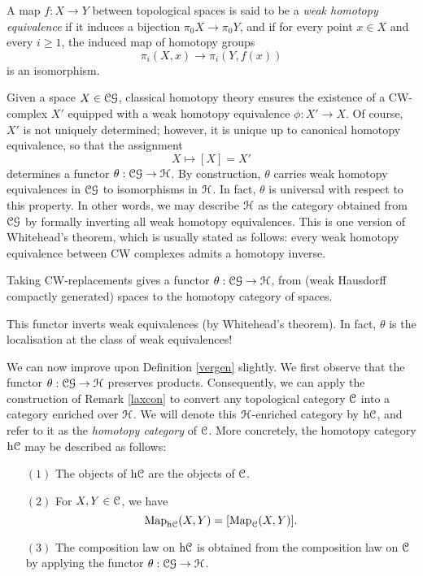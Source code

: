 \begin{1.1.3 Equivalences of Top Cats}
\begin{definition}
A map $f: X \rightarrow Y$ between topological spaces is said to be a {\it weak homotopy equivalence}
if it induces a bijection $\pi_0 X \rightarrow \pi_0 Y$, and if 
for every point $x \in X$ and every $i \geq 1$, the induced map of homotopy groups
$$ \pi_{i}(X,x) \rightarrow \pi_i(Y,f(x))$$ is an isomorphism.
\end{definition}

Given a space $X \in \operatorname{\mathcal{C}\mathcal{G}}$, classical homotopy theory ensures the existence of a CW-complex
$X'$ equipped with a weak homotopy equivalence $\phi: X' \rightarrow X$. Of course,
$X'$ is not uniquely determined; however, it is unique up to canonical homotopy equivalence,
so that the assignment
$$ X \mapsto [X] = X'$$
determines a functor $\theta: \operatorname{\mathcal{C}\mathcal{G}} \rightarrow \operatorname{\mathcal{H}}$. By construction, $\theta$ carries
weak homotopy equivalences in $\operatorname{\mathcal{C}\mathcal{G}}$ to isomorphisms in $\operatorname{\mathcal{H}}$. In fact, $\theta$
is universal with respect to this property. In other words, we may describe $\operatorname{\mathcal{H}}$
as the category obtained from $\operatorname{\mathcal{C}\mathcal{G}}$ by formally inverting all weak homotopy equivalences.
This is one version of Whitehead's theorem, which is usually stated as follows: every weak homotopy equivalence between CW complexes admits a homotopy inverse.
\begin{shaded}
Taking CW-replacements gives a functor $\theta: \operatorname{\mathcal{C}\mathcal{G}} \rightarrow \operatorname{\mathcal{H}}$, from (weak Hausdorff compactly generated) spaces to the homotopy category of spaces.

This functor inverts weak equivalences (by Whitehead's theorem). In fact, $\theta$ is the localisation at the class of weak equivalences!
\end{shaded}


We can now improve upon Definition \ref{vergen} slightly. We first observe that
the functor $\theta: \operatorname{\mathcal{C}\mathcal{G}} \rightarrow \operatorname{\mathcal{H}}$ preserves products. Consequently, we can apply the construction of Remark \ref{laxcon} to convert any topological category $\operatorname{\mathcal{C}}$ into a category enriched over $\operatorname{\mathcal{H}}$. We will denote this $\operatorname{\mathcal{H}}$-enriched category by $\rm{h} \it{\operatorname{\mathcal{C}}}$, and refer to it as the {\it homotopy category} of $\operatorname{\mathcal{C}}$. More concretely, the homotopy category
$\rm{h} \it{\operatorname{\mathcal{C}}}$ may be described as follows:
\begin{itemize}
\item[$(1)$] The objects of $\rm{h} \it{\operatorname{\mathcal{C}}}$ are the objects of $\operatorname{\mathcal{C}}$.
\item[$(2)$] For $X,Y \in \operatorname{\mathcal{C}}$, we have
$$ \operatorname{{Map}}_{ \rm{h} \it{\operatorname{\mathcal{C}}} }(X,Y) = [ \operatorname{{Map}}_{\operatorname{\mathcal{C}}}(X,Y) ].$$
\item[$(3)$] The composition law on $\rm{h} \it{\operatorname{\mathcal{C}}}$ is obtained from the composition law on
$\operatorname{\mathcal{C}}$ by applying the functor $\theta: \operatorname{\mathcal{C}\mathcal{G}} \rightarrow \operatorname{\mathcal{H}}$.
\end{itemize}


\end{1.1.3 Equivalences of Top Cats}
